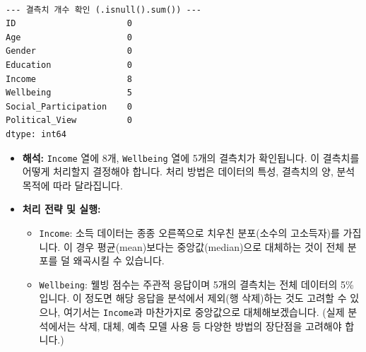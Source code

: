 \documentclass[
  letterpaper,
]{book}
\providecommand{\tightlist}{%
  \setlength{\itemsep}{0pt}\setlength{\parskip}{0pt}}
\begin{document}
\begin{verbatim}

--- 결측치 개수 확인 (.isnull().sum()) ---
ID                      0
Age                     0
Gender                  0
Education               0
Income                  8
Wellbeing               5
Social_Participation    0
Political_View          0
dtype: int64
\end{verbatim}

\begin{itemize}
\tightlist
\item
  \textbf{해석:} \texttt{Income} 열에 8개, \texttt{Wellbeing} 열에 5개의
  결측치가 확인됩니다. 이 결측치를 어떻게 처리할지 결정해야 합니다. 처리
  방법은 데이터의 특성, 결측치의 양, 분석 목적에 따라 달라집니다.
\item
  \textbf{처리 전략 및 실행:}

  \begin{itemize}
  \tightlist
  \item
    \texttt{Income}: 소득 데이터는 종종 오른쪽으로 치우친 분포(소수의
    고소득자)를 가집니다. 이 경우 평균(mean)보다는 중앙값(median)으로
    대체하는 것이 전체 분포를 덜 왜곡시킬 수 있습니다.
  \item
    \texttt{Wellbeing}: 웰빙 점수는 주관적 응답이며 5개의 결측치는 전체
    데이터의 5\%입니다. 이 정도면 해당 응답을 분석에서 제외(행 삭제)하는
    것도 고려할 수 있으나, 여기서는 \texttt{Income}과 마찬가지로
    중앙값으로 대체해보겠습니다. (실제 분석에서는 삭제, 대체, 예측 모델
    사용 등 다양한 방법의 장단점을 고려해야 합니다.)
  \end{itemize}
\end{itemize}
\end{document}
